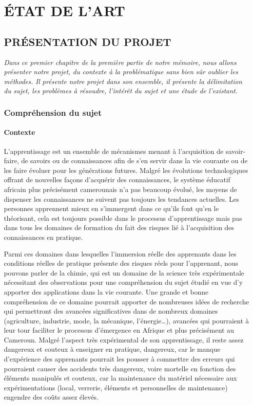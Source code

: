 \part{ÉTAT DE L’ART}
\chapter{PRÉSENTATION DU PROJET}

\textit{Dans ce premier chapitre de la première partie de notre mémoire, nous allons présenter
	notre projet, du contexte à la problématique sans bien sûr oublier les méthodes. Il présente
	notre projet dans son ensemble, il présente la délimitation du sujet, les problèmes à résoudre,
	l’intérêt du sujet et une étude de l’existant.}

\clearpage

\section{Compréhension du sujet}

\subsection{Contexte}

L’apprentissage est un ensemble de mécanismes menant à l'acquisition de savoir-faire, de savoirs ou de connaissances afin de s’en servir dans la vie courante ou de les faire évoluer pour les générations futures.
Malgré les évolutions technologiques offrant de nouvelles façons d’acquérir des connaissances, le système éducatif africain plus précisément camerounais n’a pas beaucoup évolué, les moyens de dispenser les connaissances ne suivent pas toujours les tendances actuelles.
Les personnes apprennent mieux en s’immergent dans ce qu’ils font qu’en le théorisant, cela est toujours possible dans le processus d’apprentissage mais pas dans tous les domaines de formation du fait des risques lié à l’acquisition des connaissances en pratique.

Parmi ces domaines dans lesquelles l’immersion réelle des apprenants dans les conditions réelles de pratique présente des risques réels pour l’apprenant, nous pouvons parler de la chimie, qui est un domaine de la science très expérimentale nécessitant des observations pour une compréhension du sujet étudié en vue d’y apporter des applications dans la vie courante.
Une grande et bonne compréhension de ce domaine pourrait apporter de nombreuses idées de recherche qui permettront des avancées significatives dans de nombreux domaines (agriculture, industrie, mode, la mécanique, l'énergie…), avancées qui pourraient à leur tour faciliter le processus d'émergence en Afrique et plus précisément au Cameroun.
Malgré l'aspect très expérimental de son apprentissage, il reste assez dangereux et couteux à enseigner en pratique, dangereux, car le manque d’expérience des apprenants pourrait les pousser à commettre des erreurs qui pourraient causer des accidents très dangereux, voire mortelle en fonction des éléments manipulés et couteux, car la maintenance du matériel nécessaire aux expérimentations (local, verrerie, éléments et personnelles de maintenance) engendre des coûts assez élevés.

